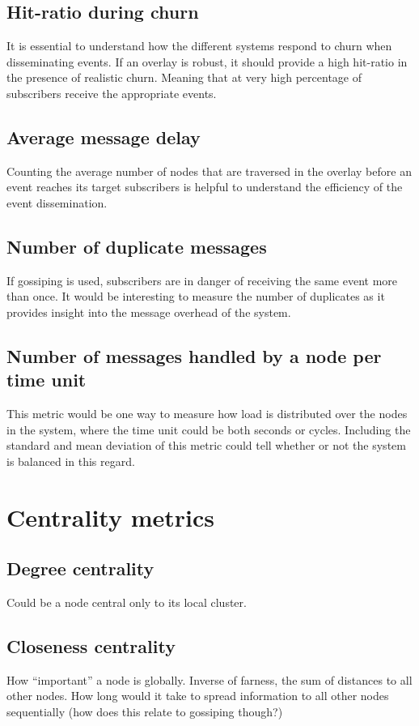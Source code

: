 \subsection{Hit-ratio during churn}
It is essential to understand how the different systems respond to
churn when disseminating events. If an overlay is robust, it should
provide a high hit-ratio in the presence of realistic churn.
Meaning that at very high percentage of subscribers receive the
appropriate events.

\subsection{Average message delay}
Counting the average number of nodes that are traversed in the
overlay before an event reaches its target subscribers is
helpful to understand the efficiency of the event dissemination.

\subsection{Number of duplicate messages}
If gossiping is used, subscribers are in danger of receiving the
same event more than once. It would be interesting to measure
the number of duplicates as it provides insight into the message overhead of the
system.

\subsection{Number of messages handled by a node per time unit}
This metric would be one way to measure how load is distributed
over the nodes in the system, where the time unit could be both
seconds or cycles. Including the standard and mean deviation of
this metric could tell whether or not the system is balanced in
this regard.

\section{Centrality metrics}

\subsection{Degree centrality}
Could be a node central only to its local cluster.

\subsection{Closeness centrality}
How ``important'' a node is globally. Inverse of farness, the sum of
distances to all other nodes. How long would it take to spread
information to all other nodes sequentially (how does this relate to
gossiping though?)

